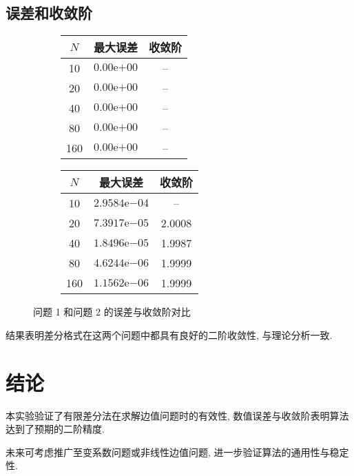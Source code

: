 \documentclass[11pt]{article}
\begin{document}
\subsection{误差和收敛阶}
\begin{figure}[ht]
	\centering
	\begin{subfigure}[b]{0.45\textwidth}
		\centering
		\begin{tabular}{ccc}
		\toprule
		$N$ & 最大误差 & 收敛阶 \\
		\midrule
		10  & $0.00\mathrm{e}{+00}$ & --     \\
		20  & $0.00\mathrm{e}{+00}$ & --     \\
		40  & $0.00\mathrm{e}{+00}$ & --     \\
		80  & $0.00\mathrm{e}{+00}$ & --     \\
		160 & $0.00\mathrm{e}{+00}$ & --     \\
		\bottomrule
		\end{tabular}
	\end{subfigure}
	\hspace{0.5cm}
	\begin{subfigure}[b]{0.45\textwidth}
		\centering
		\begin{tabular}{ccc}
		\toprule
		$N$ & 最大误差 & 收敛阶 \\
		\midrule
		10  & $2.9584\mathrm{e}{-04}$ & --     \\
		20  & $7.3917\mathrm{e}{-05}$ & 2.0008 \\
		40  & $1.8496\mathrm{e}{-05}$ & 1.9987 \\
		80  & $4.6244\mathrm{e}{-06}$ & 1.9999 \\
		160 & $1.1562\mathrm{e}{-06}$ & 1.9999 \\
		\bottomrule
		\end{tabular}
	\end{subfigure}
	\caption{问题 1 和问题 2 的误差与收敛阶对比}
\end{figure}

结果表明差分格式在这两个问题中都具有良好的二阶收敛性, 与理论分析一致.

\section{结论}

本实验验证了有限差分法在求解边值问题时的有效性, 数值误差与收敛阶表明算法达到了预期的二阶精度.

未来可考虑推广至变系数问题或非线性边值问题, 进一步验证算法的通用性与稳定性.
\end{document}
